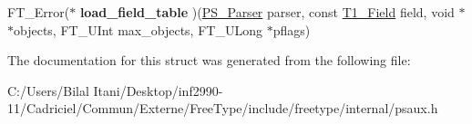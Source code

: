 \begin{DoxyCompactItemize}
\item 
F\+T\+\_\+\+Error($\ast$ {\bfseries load\+\_\+field\+\_\+table} )(\hyperlink{struct_p_s___parser_rec__}{P\+S\+\_\+\+Parser} parser, const \hyperlink{struct_t1___field_rec__}{T1\+\_\+\+Field} field, void $\ast$$\ast$objects, F\+T\+\_\+\+U\+Int max\+\_\+objects, F\+T\+\_\+\+U\+Long $\ast$pflags)\hypertarget{struct_p_s___parser___funcs_rec___a0952dd98193c4f73fe0a1281188ad395}{}\label{struct_p_s___parser___funcs_rec___a0952dd98193c4f73fe0a1281188ad395}

\end{DoxyCompactItemize}


The documentation for this struct was generated from the following file\+:\begin{DoxyCompactItemize}
\item 
C\+:/\+Users/\+Bilal Itani/\+Desktop/inf2990-\/11/\+Cadriciel/\+Commun/\+Externe/\+Free\+Type/include/freetype/internal/psaux.\+h\end{DoxyCompactItemize}
